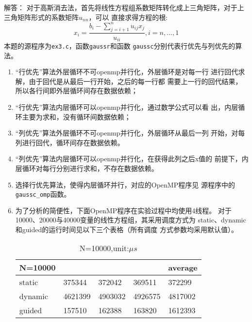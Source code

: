 \documentclass{ctexart}
\begin{document}
{\heiti 解答：}
对于高斯消去法，首先将线性方程组系数矩阵转化成上三角矩阵，对于上三角矩阵形式的系数矩阵$u_{nn}$，可以
直接求得方程的根:
$$
x_{i} = \frac{b_i-\sum_{j=i+1}^{n} u_{ij} x_{j} }{u_{ii}}, i=n,...,1
$$
本题的源程序为\lstinline{ex3.c}，函数\lstinline{gaussr}和函数
\lstinline{gaussc}分别代表行优先与列优先的算法。

\begin{enumerate}[label=(\alph*)]
\item “行优先”算法外层循环不可openmp并行化，外层循环是对每一行
    进行回代求解，由于回代是从最后一行开始，之后的每一行都
    需要上一行的回代结果，所以各行间即外层循环间存在数据依赖；
\item “行优先”算法内层循环可以openmp并行化，通过数学公式可以看
    出，内层循环主要为求和，没有循环间数据依赖；
\item “列优先”算法外层循环不可openmp并行化，外层循环从最后一列
    开始，对每列进行回代，循环间存在数据依赖。
\item “列优先”算法内层循环可以openmp并行化，在获得此列之后x值的
    前提下，内层循环对每行分别进行求和，不存在数据依赖。
\item  选择行优先算法，使得内层循环并行，对应的OpenMP程序见
    源程序中的
    \lstinline{gaussc_omp}函数。
\item 为了分析的简便性，下面OpenMP程序在实验过程中均使用4线程。
    对于10000、20000与40000变量的线性方程组，其采用调度方式为
    static、dynamic和guided的运行时间见以下三个表格（所有调度
    方式参数均采用默认值）。

        \begin{table}[]
            \centering
            \caption{N=10000,unit:$\mu s$}
            \label{my-label}
            \begin{tabular}{@{}lllll@{}}
                \toprule
                N=10000 &         &         &         & average  \\ \midrule
                static  & 375344  & 372042  & 369511  & 372299   \\
                dynamic & 4621399 & 4903032 & 4926575 & 4817002  \\
                guided  & 157510  & 162388  & 163820  & 1612393 \\ \bottomrule
            \end{tabular}
        \end{table}


\end{enumerate}
\end{document}
